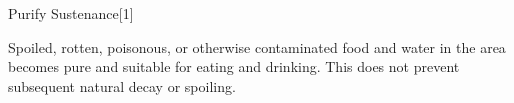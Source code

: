 \begin{spellsection}{Purify Sustenance}[1]

\begin{spellcontent}

\begin{spelltargetinginfo}


\end{spelltargetinginfo}


\begin{spelleffects}



\spelleffect
Spoiled, rotten, poisonous, or otherwise contaminated food and water in the area becomes pure and suitable for eating and drinking.
This does not prevent subsequent natural decay or spoiling.








\end{spelleffects}

\end{spellcontent}
\begin{spellfooter}


\end{spellfooter}
\begin{spellsubcontent}


\end{spellsubcontent}
\end{spellsection}


